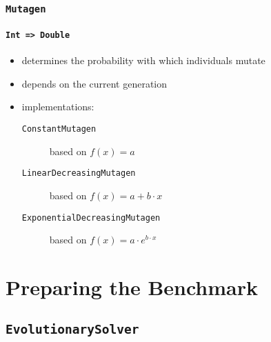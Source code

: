 \documentclass[compress,xcolor=table]{beamer}
\begin{document}
\begin{frame}
  \frametitle{\texttt{Mutagen}}
  \framesubtitle{\texttt{Int => Double}}
  \begin{itemize}
    \item determines the probability with which individuals mutate
    \item depends on the current generation
    \item implementations:
    \begin{description}
      \item[\texttt{ConstantMutagen}] $~$ \\ based on $f(x) = a$
      \item[\texttt{LinearDecreasingMutagen}] $~$ \\ based on $f(x) = a + b \cdot x$
      \item[\texttt{ExponentialDecreasingMutagen}] $~$ \\ based on $f(x) = a \cdot e^{b \cdot x}$
    \end{description}
  \end{itemize}
\end{frame}


\section{Preparing the Benchmark}

\subsection{\texttt{EvolutionarySolver}}
\end{document}
